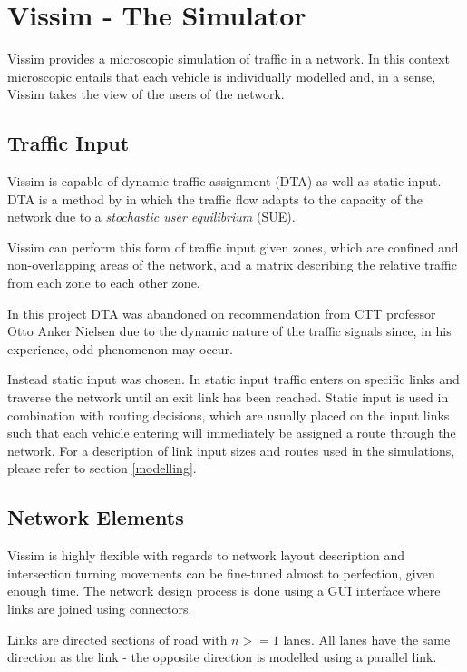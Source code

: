 \section{Vissim - The Simulator}
Vissim provides a microscopic simulation of traffic in a network. In this context microscopic entails that each vehicle is individually modelled and, in a sense, Vissim takes the view of the users of the network.

\subsection{Traffic Input}
Vissim is capable of dynamic traffic assignment (DTA) as well as static input. DTA is a method by \cite{Wardrop} in which the traffic flow adapts to the capacity of the network due to a \textit{stochastic user equilibrium} (SUE). 

Vissim can perform this form of traffic input given zones, which are confined and non-overlapping areas of the network, and a matrix describing the relative traffic from each zone to each other zone.

In this project DTA was abandoned on recommendation from CTT professor Otto Anker Nielsen due to the dynamic nature of the traffic signals since, in his experience, odd phenomenon may occur.

Instead static input was chosen. In static input traffic enters on specific links and traverse the network until an exit link has been reached. Static input is used in combination with routing decisions, which are usually placed on the input links such that each vehicle entering will immediately be assigned a route through the network. For a description of link input sizes and routes used in the simulations, please refer to section \ref{modelling}.

\subsection{Network Elements}

Vissim is highly flexible with regards to network layout description and intersection turning movements can be fine-tuned almost to perfection, given enough time. The network design process is done using a GUI interface where links are joined using connectors.

Links are directed sections of road with $n>=1$ lanes. All lanes have the same direction as the link - the opposite direction is modelled using a parallel link.


